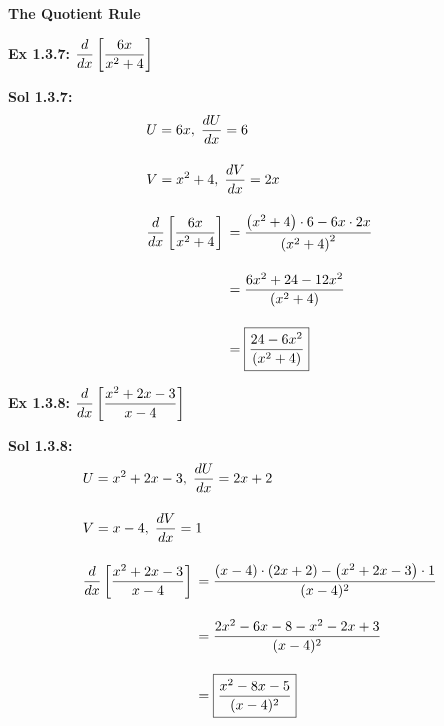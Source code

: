 \bigskip

\textbf{\large{The Quotient Rule}} \par

\begin{tcolorbox}[example]
    \textbf{Ex 1.3.7: } $\dfrac{d}{dx} \left[\dfrac{6x}{x^2 + 4}\right]$
\end{tcolorbox}
\begin{tcolorbox}[solution]
    \textbf{Sol 1.3.7: } \begin{align*}
        & U = 6x, \; \dfrac{dU}{dx} = 6 \\[11pt]
        & V = x^2 + 4, \; \dfrac{dV}{dx} = 2x \\[11pt]
        & \dfrac{d}{dx} \left[\dfrac{6x}{x^2 + 4}\right] \begin{aligned}[t]
            & = \dfrac{\left(x^2 + 4\right) \cdot 6 - 6x \cdot 2x}{\left(x^2 + 4\right)^2} \\[11pt]
            & = \dfrac{6x^2 + 24 - 12x^2}{\left(x^2 + 4\right)} \\[11pt]
            & = \boxed{\dfrac{24 - 6x^2}{\left(x^2 + 4\right)}}
        \end{aligned}
    \end{align*}
\end{tcolorbox} \vspace{11pt}    

\begin{tcolorbox}[example]
    \textbf{Ex 1.3.8: } $\dfrac{d}{dx} \left[\dfrac{x^2 + 2x - 3}{x - 4}\right]$ 
\end{tcolorbox}
\begin{tcolorbox}[solution]
    \textbf{Sol 1.3.8: } \begin{align*}
        & U = x^2 + 2x - 3, \; \dfrac{dU}{dx} = 2x + 2 \\[11pt]
        & V = x - 4, \; \dfrac{dV}{dx} = 1 \\[11pt]
        & \dfrac{d}{dx} \left[\dfrac{x^2 + 2x - 3}{x - 4}\right] \begin{aligned}[t]
            & = \dfrac{(x - 4) \cdot (2x + 2) - \left(x^2 + 2x - 3\right) \cdot 1}{(x - 4)^2} \\[11pt]
            & = \dfrac{2x^2 - 6x - 8 - x^2 - 2x + 3}{(x - 4)^2} \\[11pt]
            & = \boxed{\dfrac{x^2 - 8x - 5}{(x - 4)^2}}
        \end{aligned}
    \end{align*} 
\end{tcolorbox} \vspace{11pt}

